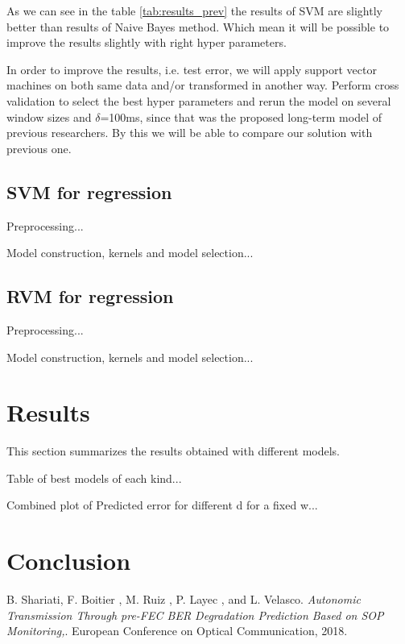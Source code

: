 \documentclass[a4paper]{article}
\begin{document}
As we can see in the table \ref{tab:results_prev} the results of SVM are slightly better than results of Naive Bayes method. Which mean it will be possible to improve the results slightly with right hyper parameters.

In order to improve the results, i.e. test error, we will apply support vector machines on both same data and/or transformed in another way. Perform cross validation to select the best hyper parameters and rerun the model on several window sizes and $\delta$=100ms, since that was the proposed long-term model of previous researchers. By this we will be able to compare our solution with previous one.

\subsection{SVM for regression}

Preprocessing...

Model construction, kernels and model selection...

\subsection{RVM for regression}

Preprocessing...

Model construction, kernels and model selection...




\section{Results}

This section summarizes the results obtained with different models.

Table of best models of each kind...

Combined plot of Predicted error for different d for a fixed w...


\section{Conclusion}



\begin{thebibliography}{9}
B. Shariati, F. Boitier , M. Ruiz , P. Layec , and L. Velasco.
\textit{Autonomic Transmission Through pre-FEC BER Degradation Prediction Based on SOP Monitoring,}. 
European Conference on Optical Communication, 2018.
 
\end{thebibliography}
\end{document}
